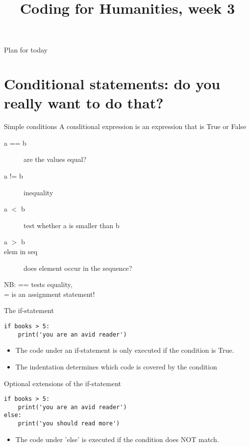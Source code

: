 \documentclass[aspectratio=169,usenames,dvipsnames]{beamer}
\title{Coding for Humanities, week 3}
\begin{document}
\begin{frame}
 \titlepage
\end{frame}

\begin{frame}{Plan for today}
 \tableofcontents
\end{frame}

\section{Conditional statements: do you really want to do that?}
\frame{\tableofcontents[currentsection]}

\begin{frame}{Simple conditions}
    A conditional expression is
    an expression that is True or False
    \begin{description}
        \item[a == b] are the values equal?
        \item[a != b] inequality
        \item[a $<$ b] test whether a is smaller than b
        \item[a $>$ b]
        \item[elem in seq] does element occur in the sequence?
    \end{description}

    NB: == tests equality, \\
        = is an assignment statement!
\end{frame}

\begin{frame}[fragile]{The if-statement}
\begin{lstlisting}
if books > 5:
    print('you are an avid reader')
\end{lstlisting}

\begin{itemize}
    \item The code under an if-statement is only executed
        if the condition is True.
    \item The indentation determines which code is covered
        by the condition
\end{itemize}
\end{frame}


\begin{frame}[fragile]{Optional extensions of the if-statement}
\begin{lstlisting}
if books > 5:
    print('you are an avid reader')
else:
    print('you should read more')
\end{lstlisting}

\begin{itemize}
    \item The code under 'else' is executed if the condition does NOT match.
\end{itemize}
\end{frame}
\end{document}
